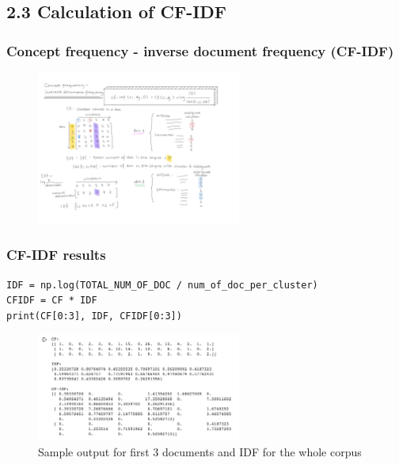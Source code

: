 \documentclass{tum-presentation}
\begin{document}
\subsection{2.3 Calculation of CF-IDF}
\begin{frame}
  \frametitle{Concept frequency - inverse document frequency (CF-IDF)}
  \begin{center}
    \begin{figure}[t]
      \includegraphics[width=0.6\textwidth]{images/CF-IDF_concept.png}
    \end{figure}
  \end{center}
\end{frame}

\begin{frame}[fragile]
  \frametitle{CF-IDF results}
  \begin{lstlisting}
IDF = np.log(TOTAL_NUM_OF_DOC / num_of_doc_per_cluster)
CFIDF = CF * IDF
print(CF[0:3], IDF, CFIDF[0:3])
  \end{lstlisting}
  \begin{center}
    \begin{figure}[t]
      \includegraphics[width=0.6\textwidth]{images/CF-IDF_result.png}
      \caption{Sample output for first 3 documents and IDF for the whole corpus}
    \end{figure}
  \end{center}
\end{frame}
\end{document}
